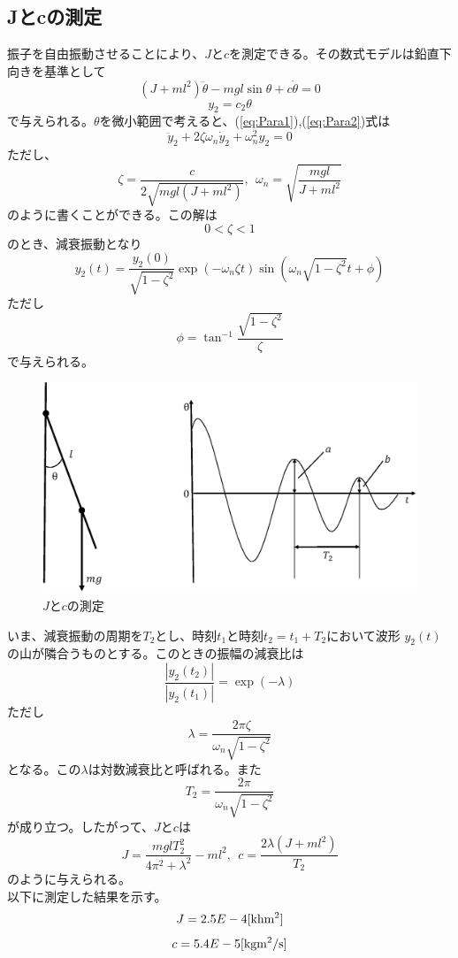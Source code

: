 \subsection{Jとcの測定}
	振子を自由振動させることにより、$J$と$c$を測定できる。その数式モデルは鉛直下向きを基準として
	\begin{equation}
		(J + ml^{2})\ddot{\theta} - mgl\sin{\theta} + c\dot{\theta} = 0
		\label{eq:Para1}
	\end{equation}
	\begin{equation}
		y_{2} = c_{2}\theta
	\label{eq:Para2}
	\end{equation}
	で与えられる。$\theta$を微小範囲で考えると、(\ref{eq:Para1}),(\ref{eq:Para2})式は
	\begin{equation}
		\ddot{y}_{2} + 2\zeta\omega_{n}\dot{y}_{2} + \omega_{n}^{2}y_{2} = 0
	\end{equation}
	ただし、
	\begin{equation}
		\zeta = \frac{c}{2\sqrt{mgl\left(J + ml^{2}\right)}} 
		,\ \  \omega_{n} = \sqrt{\frac{mgl}{J+ml^{2}}}
	\end{equation}
	のように書くことができる。この解は
	\[0<\zeta<1\]
	のとき、減衰振動となり
	\[
		y_{2}(t) = \frac{y_{2}(0)}{\sqrt{1-\zeta^{2}}}\exp{(-\omega_{n}\zeta t)}
	  	\sin{(\omega_{n}\sqrt{1-\zeta^{2}}t + \phi)}
	\]
	ただし
	\[
		\phi = \tan^{-1}{\frac{\sqrt{1-\zeta^2}}{\zeta}}
	\]
	で与えられる。
	\begin{figure}[H]
		\centering
		\includegraphics[width=1.0\linewidth]{gazo/ParameterJC.eps}
		\caption{$J$と$c$の測定}
		\label{image:parameterJC}
	\end{figure}
	\par
	いま、減衰振動の周期を$T_{2}$とし、時刻$t_{1}$と時刻$t_{2} = t_{1}+T_{2}$において波形
	$y_{2}(t)$の山が隣合うものとする。このときの振幅の減衰比は
	\[
		\frac{|y_{2}(t_{2})|}{|y_{2}(t_{1})|} = \exp{(-\lambda)}
	\]
	ただし
	\begin{equation}
		\lambda = \frac{2\pi\zeta}{\omega_{n}\sqrt{1-\zeta^2}}
	\end{equation}
	となる。この$\lambda$は対数減衰比と呼ばれる。また
	\[
		T_{2} = \frac{2\pi}{\omega_{n}\sqrt{1-\zeta^{2}}}
	\]
	が成り立つ。したがって、$J$と$c$は
	\begin{equation}
		J=\frac{mglT_{2}^{2}}{4\pi^{2}+\lambda^{2}}-ml^{2},\ \ 
		c=\frac{2\lambda(J+ml^{2})}{T_{2}}
	\end{equation}
	のように与えられる。\\
	以下に測定した結果を示す。
	\[
		J=2.5E-4[\rm{khm^{2}}]
	\]
	\[
		c=5.4E-5[\rm{kgm^{2}/s}]
	\]
	

